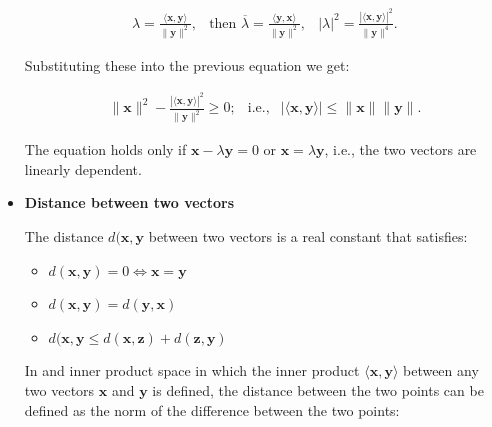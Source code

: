 \documentclass[10pt,b5paper,titlepage]{book}
\begin{document}
\begin{itemize}
        \begin{equation}
            \begin{array}{lcr}
                \lambda
                = \frac{\langle \mathbf{x}, \mathbf{y} \rangle}{\|\mathbf{y}\|^{2}},&
                \text{then } \overline{\lambda}
                = \frac{\langle \mathbf{y}, \mathbf{x} \rangle}{\|\mathbf{y}\|^{2}},&
                |\lambda|^{2}
                = \frac{|\langle \mathbf{x}, \mathbf{y} \rangle|^{2}}{\|\mathbf{y}\|^{4}}.
            \end{array}
        \end{equation}

        Substituting these into the previous equation we get:

        \begin{equation}
            \begin{array}{lcr}
                \|\mathbf{x}\|^{2}
                - \frac{|\langle \mathbf{x}, \mathbf{y} \rangle|^{2}}
                {\|\mathbf{y}\|^{2}} \ge 0;&
                \text{i.e.,}&
                |\langle \mathbf{x}, \mathbf{y} \rangle|
                \le \|\mathbf{x}\| \|\mathbf{y}\|.
            \end{array}
        \end{equation}

        The equation holds only if $\mathbf{x} - \lambda \mathbf{y} = 0$
        or $\mathbf{x} = \lambda \mathbf{y}$, i.e., the two vectors are
        linearly dependent.

    \item \textbf{Distance between two vectors}

        The distance $d(\mathbf{x}, \mathbf{y}$ between two vectors is
        a real constant that satisfies:

        \begin{itemize}
            \item $d(\mathbf{x}, \mathbf{y}) = 0 \iff \mathbf{x} = \mathbf{y}$
            \item $d(\mathbf{x}, \mathbf{y}) = d(\mathbf{y}, \mathbf{x})$
            \item $d(\mathbf{x}, \mathbf{y} \le  d(\mathbf{x}, \mathbf{z}) + d(\mathbf{z}, \mathbf{y})$
        \end{itemize}

        In and inner product space in which the inner product
        $\langle \mathbf{x}, \mathbf{y} \rangle$ between any two vectors
        $\mathbf{x}$ and $\mathbf{y}$ is defined, the distance between
        the two points can be defined as the norm of the difference
        between the two points:


\end{itemize}
\end{document}
